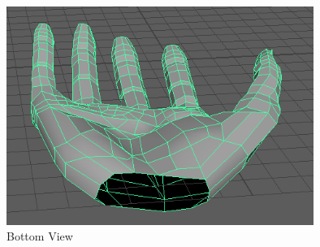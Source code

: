 \documentclass[a4paper]{article}
\begin{document}
\begin{figure}[h]
\centering
\includegraphics[width=10cm]{img/back.png}
\caption{Bottom View}
\label{fig:Back View}
\end{figure}
\end{document}

